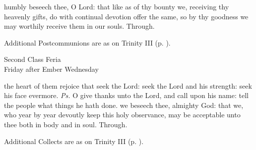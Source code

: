 \postcommunion
{} humbly beseech thee, O Lord: that like as of thy bounty we, receiving thy heavenly gifts, do with continual devotion offer the same, so by thy goodness we may worthily receive them in our souls. Through.
\begin{rubric}
    Additional Postcommunions are as on Trinity III (p. \pageref{TrinityIIIPostcommunion}).
\end{rubric}

\begin{inhead}
    {Second Class Feria\\
Friday after Ember Wednesday}
\end{inhead}
\par\noindent
{}
\introit
{} the heart of them rejoice that seek the Lord: seek the Lord and his strength: seek his face evermore. \textit{Ps.} O give thanks unto the Lord, and call upon his name: tell the people what things he hath done.
\collect
{} we beseech thee, almighty God: that we, who year by year devoutly keep this holy observance, may be acceptable unto thee both in body and in soul. Through.
\begin{rubric}
    Additional Collects are as on Trinity III (p. \pageref{TrinityIIICollect}).
\end{rubric}

